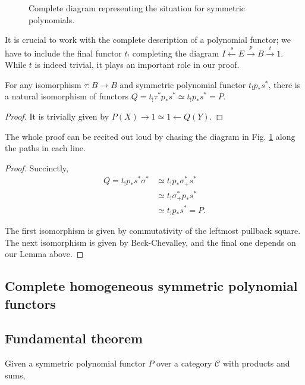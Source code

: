 \begin{figure}[!ht]
\centering
{}
\caption{Complete diagram representing the situation for symmetric polynomials.}\label{fig:sympol}
\end{figure}

It is crucial to work with the complete description of a polynomial functor; we have to include the final functor $t_!$ completing the diagram $I\overset{s}{\gets} E\overset{p}{\to} B\overset{t}{\to} 1$. While $t$ is indeed trivial, it plays an important role in our proof.

\begin{lemma}\label{lemma:thelps}
For any isomorphism $\tau:B\to B$ and symmetric polynomial functor $t_!p_*s^*$, there is a natural isomorphism of functors $Q=t_!\tau^*p_*s^* \simeq t_!p_*s^*=P$.
\end{lemma}
\begin{proof}
It is trivially given by $P(X)\to 1 \simeq 1 \gets Q(Y)$.
\end{proof}

The whole proof can be recited out loud by chasing the diagram in Fig. \ref{fig:sympol} along the paths in each line.

\begin{proof}
Succinctly,
\begin{align}
Q = t_!p_*s^*\sigma^* &\simeq t_!p_*\sigma_+^*s^*\\
	&\simeq t_!\sigma_+^*p_*s^*\\
    &\simeq t_!p_*s^* = P.
\end{align}

The first isomorphism is given by commutativity of the leftmost pullback square. The next isomorphism is given by Beck-Chevalley, and the final one depends on our Lemma above.

\end{proof}

\subsection{Complete homogeneous symmetric polynomial functors}



\subsection{Fundamental theorem}

\begin{theorem}
Given a symmetric polynomial functor $P$ over a category $\mathcal{C}$ with products and sums,
\end{theorem}
